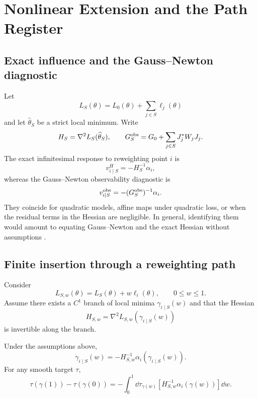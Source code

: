 \section{Nonlinear Extension and the Path Register}
\subsection{Exact influence and the Gauss--Newton diagnostic}
Let
\[
L_S(\theta)=L_0(\theta)+\sum_{j\in S}\ell_j(\theta)
\]
and let $\widehat\theta_S$ be a strict local minimum. Write
\[
H_S=\nabla^2L_S(\widehat\theta_S),
\qquad
G_S^{\rm obs}=G_0+\sum_{j\in S}J_j^*W_jJ_j.
\]
The exact infinitesimal response to reweighting point $i$ is
\begin{equation}
v_{i\mid S}^{H}=-H_S^{-1}\alpha_i,
\label{eq:exact-influence}
\end{equation}
whereas the Gauss--Newton observability diagnostic is
\begin{equation}
v_{i\mid S}^{\rm obs}=-(G_S^{\rm obs})^{-1}\alpha_i.
\label{eq:gn-influence}
\end{equation}
They coincide for quadratic models, affine maps under quadratic loss, or when the residual terms in the Hessian are negligible. In general, identifying them would amount to equating Gauss--Newton and the exact Hessian without assumptions \citep{schraudolph2002,martens2020}.

\subsection{Finite insertion through a reweighting path}
Consider
\begin{equation}
L_{S,w}(\theta)=L_S(\theta)+w\ell_i(\theta),
\qquad 0\leq w\leq1.
\end{equation}
Assume there exists a $C^1$ branch of local minima $\gamma_{i\mid S}(w)$ and that the Hessian
\[
H_{S,w}=\nabla^2L_{S,w}(\gamma_{i\mid S}(w))
\]
is invertible along the branch.

\begin{theorem}
Under the assumptions above,
\begin{equation}
\boxed{
\dot\gamma_{i\mid S}(w)
=-H_{S,w}^{-1}\alpha_i(\gamma_{i\mid S}(w)).
}
\label{eq:insertion-path}
\end{equation}
For any smooth target $\tau$,
\begin{equation}
\boxed{
\tau(\gamma(1))-\tau(\gamma(0))
=-\int_0^1\dd\tau_{\gamma(w)}
\left[H_{S,w}^{-1}\alpha_i(\gamma(w))\right]\dd w.
}
\label{eq:finite-target-effect}
\end{equation}
\end{theorem}

